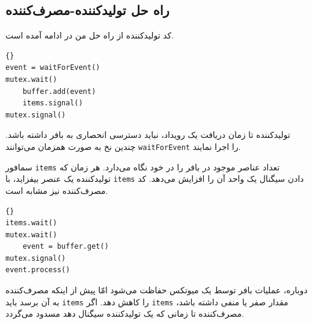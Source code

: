 \documentclass{book}
\begin{document}
\subsection{راه حل تولیدکننده-مصرف‌کننده}

    کد تولیدکننده از راه حل من در ادامه آمده است. 

\begin{latin}
\begin{lstlisting}[title=\rl{راه حل تولیدکننده}]{}
event = waitForEvent()
mutex.wait()
    buffer.add(event)
    items.signal()
mutex.signal()
\end{lstlisting}
\end{latin}

    تولیدکننده تا زمان دریافت یک رویداد، نباید دسترسی انحصاری به بافر داشته باشد. 
    چندین نخ به صورت همزمان می‌توانند  {\tt waitForEvent} را اجرا نمایند. 
    
    سمافور {\tt items} تعداد عناصر موجود در بافر را در خود نگاه می‌دارد. هر زمان که تولیدکننده یک عنصر بیفزاید، با {\tt items}
    دادن سیگنال یک واحد آن را افزایش می‌دهد. 
    کد مصرف‌کننده نیز مشابه است. 

\begin{latin}
\begin{latin}
\begin{lstlisting}[title=\rl{راه حل مصرف‌کننده}]{}
items.wait()
mutex.wait()
    event = buffer.get()
mutex.signal()
event.process()
\end{lstlisting}
\end{latin}
\end{latin}

    دوباره، عملیات بافر توسط یک میوتکس حفاظت می‌شود امّا پیش از اینکه مصرف‌کننده به آن برسد باید {\tt items} را کاهش دهد. 
    اگر {\tt items} مقدار صفر یا منفی داشته باشد، مصرف‌کننده تا زمانی که یک تولیدکننده سیگنال دهد مسدود می‌گردد. 
\end{document}
